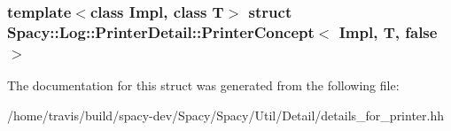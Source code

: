 \subsubsection*{template$<$class Impl, class T$>$ struct Spacy\-::\-Log\-::\-Printer\-Detail\-::\-Printer\-Concept$<$ Impl, T, false $>$}



\-The documentation for this struct was generated from the following file\-:\begin{DoxyCompactItemize}
\item 
/home/travis/build/spacy-\/dev/\-Spacy/\-Spacy/\-Util/\-Detail/details\-\_\-for\-\_\-printer.\-hh\end{DoxyCompactItemize}
